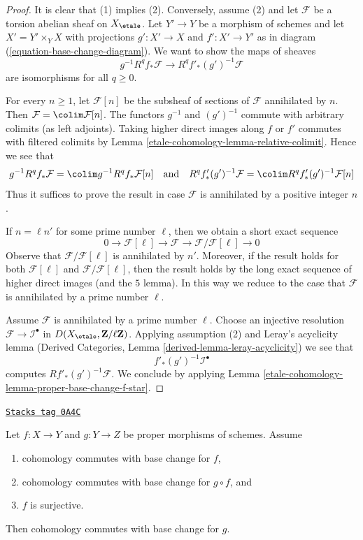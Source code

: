 \begin{proof}
It is clear that (1) implies (2). Conversely, assume (2) and let
$\mathcal{F}$ be a torsion abelian sheaf on $X_\etale$. Let $Y' \to Y$
be a morphism of schemes and let $X' = Y' \times_Y X$
with projections $g' : X' \to X$ and $f' : X' \to Y'$ as in
diagram (\ref{equation-base-change-diagram}).
We want to show the maps of sheaves
$$
g^{-1}R^qf_*\mathcal{F} \longrightarrow R^qf'_*(g')^{-1}\mathcal{F}
$$
are isomorphisms for all $q \geq 0$.

\medskip\noindent
For every $n \geq 1$, let $\mathcal{F}[n]$ be the subsheaf of sections
of $\mathcal{F}$ annihilated by $n$. Then
$\mathcal{F} = \colim \mathcal{F}[n]$.
The functors $g^{-1}$ and $(g')^{-1}$ commute with arbitrary colimits
(as left adjoints). Taking higher direct images along $f$ or $f'$
commutes with filtered colimits by Lemma \ref{etale-cohomology-lemma-relative-colimit}.
Hence we see that
$$
g^{-1}R^qf_*\mathcal{F} = \colim g^{-1}R^qf_*\mathcal{F}[n]
\quad\text{and}\quad
R^qf'_*(g')^{-1}\mathcal{F} =
\colim R^qf'_*(g')^{-1}\mathcal{F}[n]
$$
Thus it suffices to prove the result in case $\mathcal{F}$ is
annihilated by a positive integer $n$.

\medskip\noindent
If $n = \ell n'$ for some prime number $\ell$, then we obtain a short
exact sequence
$$
0 \to \mathcal{F}[\ell] \to \mathcal{F} \to
\mathcal{F}/\mathcal{F}[\ell] \to 0
$$
Observe that $\mathcal{F}/\mathcal{F}[\ell]$ is annihilated by $n'$.
Moreover, if the result holds for both $\mathcal{F}[\ell]$ and
$\mathcal{F}/\mathcal{F}[\ell]$, then the result holds by
the long exact sequence of higher direct images (and the $5$ lemma).
In this way we reduce to the case that $\mathcal{F}$ is annihilated
by a prime number $\ell$.

\medskip\noindent
Assume $\mathcal{F}$ is annihilated by a prime number $\ell$.
Choose an injective resolution $\mathcal{F} \to \mathcal{I}^\bullet$
in $D(X_\etale, \mathbf{Z}/\ell\mathbf{Z})$. Applying assumption
(2) and Leray's acyclicity lemma
(Derived Categories, Lemma \ref{derived-lemma-leray-acyclicity})
we see that
$$
f'_*(g')^{-1}\mathcal{I}^\bullet
$$
computes $Rf'_*(g')^{-1}\mathcal{F}$. We conclude by applying
Lemma \ref{etale-cohomology-lemma-proper-base-change-f-star}.
\end{proof}

\begin{lemma}[Sandwich]
\label{etale-cohomology-lemma-sandwich}
\href{https://stacks.math.columbia.edu/tag/0A4C}{\texttt{Stacks tag 0A4C}}

Let $f : X \to Y$ and $g : Y \to Z$ be proper morphisms of schemes. Assume
\begin{enumerate}
\item cohomology commutes with base change for $f$,
\item cohomology commutes with base change for $g \circ f$, and
\item $f$ is surjective.
\end{enumerate}
Then cohomology commutes with base change for $g$.
\end{lemma}

